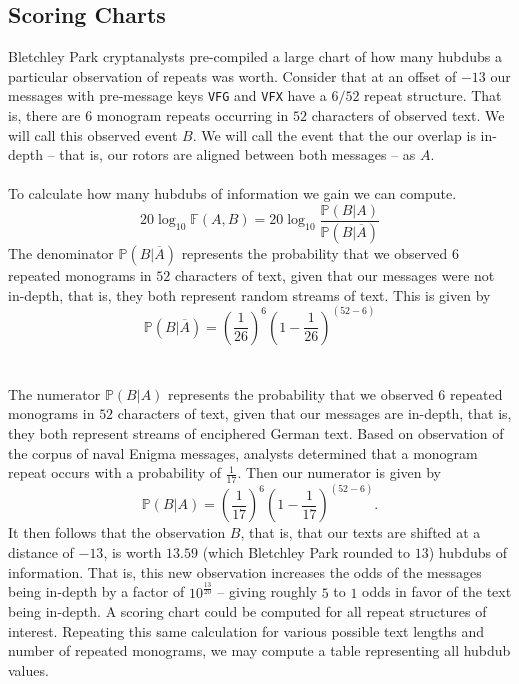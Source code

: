   \subsection{Scoring Charts}
  Bletchley Park cryptanalysts pre-compiled a large chart of how many
  hubdubs a particular observation of repeats was worth. Consider that at an offset of $-13$ our messages with
  pre-message keys \texttt{VFG} and \texttt{VFX} have a $6/52$ repeat
  structure. That is, there are $6$ monogram repeats occurring in $52$
  characters of observed text. We will call this observed event $B$.
  We will call the event that the our overlap is in-depth -- that is, our rotors are aligned between both messages -- as $A$.
  \\\\To calculate how many hubdubs of information we gain we can compute.
  \[
    20\log_{10}\mathbb{F}(A,B) =
    20\log_{10}\frac{\mathbb{P}(B|A)}{\mathbb{P}(B|\overline{A})}
  \]
  The denominator $\mathbb{P}(B|\overline{A})$ represents the
  probability that we observed $6$ repeated monograms in $52$
  characters of text, given that our messages were not in-depth, that
  is, they both represent random streams of text. This is given by
  \[
    \mathbb{P}(B|\overline{A}) = (\frac{1}{26})^6(1-\frac{1}{26})^{(52-6)}
  \]
  \\\\The numerator $\mathbb{P}(B|{A})$ represents the
  probability that we observed $6$ repeated monograms in $52$
  characters of text, given that our messages are in-depth, that is,
  they both represent streams of enciphered German text. Based on observation of
  the corpus of naval Enigma messages, analysts determined that a
  monogram repeat occurs with a probability of $\frac{1}{17}$. Then
  our numerator is given by
  \[
    \mathbb{P}(B|A) = (\frac{1}{17})^6(1-\frac{1}{17})^{(52-6)}.
  \]
  It then follows that the observation $B$, that is, that our texts
  are shifted at a distance of $-13$, is worth $13.59$ (which
  Bletchley Park rounded to $13$) hubdubs of information. That is,
  this new observation increases the odds of the messages being
  in-depth by a factor of $10^\frac{13}{20}$ -- giving roughly $5$
  to $1$ odds in favor of the text being in-depth. A scoring chart
  could be computed for all repeat structures of interest. Repeating
  this same calculation for various possible text lengths and number
  of repeated monograms, we may compute a table representing all hubdub values.
